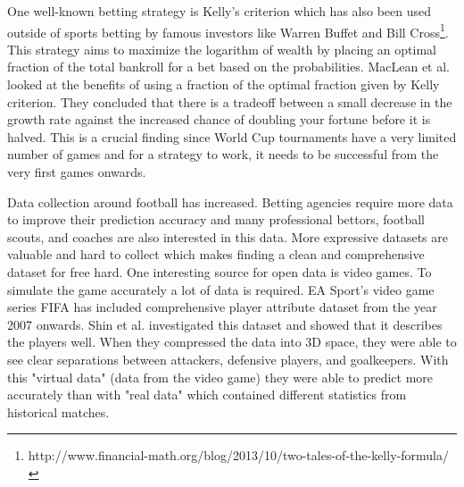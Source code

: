 One well-known betting strategy is Kelly's criterion which has also been used outside of sports betting by famous investors like Warren Buffet and Bill Cross\footnote{http://www.financial-math.org/blog/2013/10/two-tales-of-the-kelly-formula/}. This strategy aims to maximize the logarithm of wealth by placing an optimal fraction of the total bankroll for a bet based on the probabilities. MacLean et al.\cite{maclean1992growth} looked at the benefits of using a fraction of the optimal fraction given by Kelly criterion. They concluded that there is a tradeoff between a small decrease in the growth rate against the increased chance of doubling your fortune before it is halved. This is a crucial finding since World Cup tournaments have a very limited number of games and for a strategy to work, it needs to be successful from the very first games onwards.

Data collection around football has increased. Betting agencies require more data to improve their prediction accuracy and many professional bettors, football scouts, and coaches are also interested in this data. More expressive datasets are valuable and hard to collect which makes finding a clean and comprehensive dataset for free hard. One interesting source for open data is video games. To simulate the game accurately a lot of data is required. EA Sport's video game series FIFA has included comprehensive player attribute dataset from the year 2007 onwards. Shin et al. \cite{shin2014novel} investigated this dataset and showed that it describes the players well. When they compressed the data into 3D space, they were able to see clear separations between attackers, defensive players, and goalkeepers. With this "virtual data" (data from the video game) they were able to predict more accurately than with "real data" which contained different statistics from historical matches.

